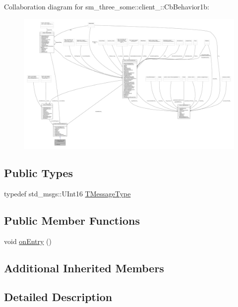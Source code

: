 Collaboration diagram for sm\+\_\+three\+\_\+some\+:\+:client\+\_\+:\+:Cb\+Behavior1b\+:
\nopagebreak
\begin{figure}[H]
\begin{center}
\leavevmode
\includegraphics[width=350pt]{classsm__three__some_1_1client__1_1_1CbBehavior1b__coll__graph}
\end{center}
\end{figure}
\subsection*{Public Types}
\begin{DoxyCompactItemize}
\item 
typedef std\+\_\+msgs\+::\+U\+Int16 \hyperlink{classsm__three__some_1_1client__1_1_1CbBehavior1b_ac131c5d5cb4ec185ed7c61caf7bfedf2}{T\+Message\+Type}
\end{DoxyCompactItemize}
\subsection*{Public Member Functions}
\begin{DoxyCompactItemize}
\item 
void \hyperlink{classsm__three__some_1_1client__1_1_1CbBehavior1b_a120b1880dc776679308a798212588d83}{on\+Entry} ()
\end{DoxyCompactItemize}
\subsection*{Additional Inherited Members}


\subsection{Detailed Description}


